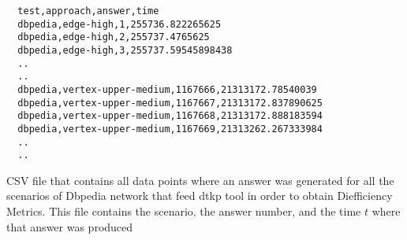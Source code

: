 \begin{listing}[htp!]
  \begin{verbatim}
  test,approach,answer,time
  dbpedia,edge-high,1,255736.822265625
  dbpedia,edge-high,2,255737.4765625
  dbpedia,edge-high,3,255737.59545898438
  ..
  ..
  dbpedia,vertex-upper-medium,1167666,21313172.78540039
  dbpedia,vertex-upper-medium,1167667,21313172.837890625
  dbpedia,vertex-upper-medium,1167668,21313172.888183594
  dbpedia,vertex-upper-medium,1167669,21313262.267333984
  ..
  ..
\end{verbatim}  
\caption[{[\texttt{results.csv}] Results CSV Dbpedia}]{CSV file that contains all data points where an answer was generated for all the scenarios of Dbpedia network that feed \acrshort{dtkp} tool in order to obtain Diefficiency Metrics. This file contains the scenario, the answer number, and the time $t$ where that answer was produced}
\label{apx:results:csv}
\end{listing}
